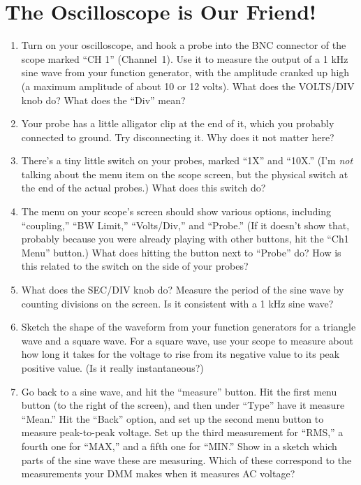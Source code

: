 \section{The Oscilloscope is Our Friend!}
\label{lab_oscilloscope}


\bigskip

\begin{enumerate}[wide]

\item Turn on your oscilloscope, and hook a probe into the BNC connector of the scope marked ``CH 1'' (Channel~1).  Use it to measure the output of a 1 kHz sine wave from your function generator, with the amplitude cranked up high (a maximum amplitude of about 10 or 12 volts).  What does the VOLTS/DIV knob do?  What does the ``Div'' mean?

\item Your probe has a little alligator clip at the end of it, which you probably connected to ground.  Try disconnecting it.  Why does it not matter here?

\item There's a tiny little switch on your probes, marked ``1X'' and ``10X.'' (I'm \emph{not} talking about the menu item on the scope screen, but the physical switch at the end of the actual probes.)  What does this switch do?

\item The menu on your scope's screen should show various options, including ``coupling,'' ``BW Limit,'' ``Volts/Div,'' and ``Probe.''  (If it doesn't show that, probably because you were already playing with other buttons, hit the ``Ch1 Menu'' button.)  What does hitting the button next to ``Probe'' do?  How is this related to the switch on the side of your probes?

\item What does the SEC/DIV knob do?  Measure the period of the sine wave by counting divisions on the screen.  Is it consistent with a 1 kHz sine wave?

\item Sketch the shape of the waveform from your function generators for a triangle wave and a square wave.  For a square wave, use your scope to measure about how long it takes for the voltage to rise from its negative value to its peak positive value.  (Is it really instantaneous?)

\item Go back to a sine wave, and hit the ``measure'' button.  Hit the first menu button (to the right of the screen), and then under ``Type'' have it measure ``Mean.''  Hit the ``Back'' option, and set up the second menu button to measure peak-to-peak voltage.  Set up the third measurement for ``RMS,'' a fourth one for ``MAX,'' and a fifth one for ``MIN.'' Show in a sketch which parts of the sine wave these are measuring.  Which of these correspond to the measurements your DMM makes when it measures AC voltage?


\end{enumerate}
